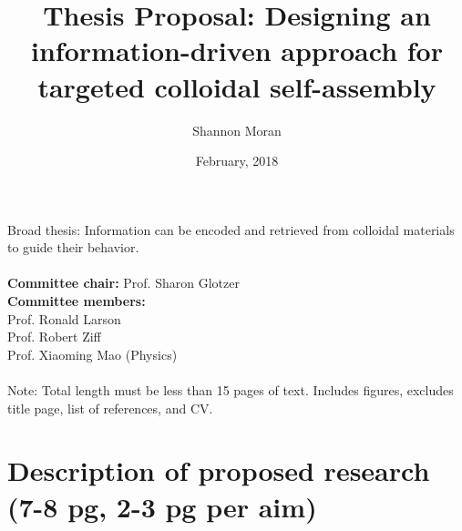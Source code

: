 \documentclass[12pt, oneside]{article}   	%
\title{Thesis Proposal: Designing an information-driven approach for targeted colloidal self-assembly}
\author{Shannon Moran}
\date{February, 2018}
\begin{document}
\maketitle
\thispagestyle{empty}
\noindent
Broad thesis: Information can be encoded and retrieved from colloidal materials to guide their behavior.
\\ \\
\textbf{Committee chair:} Prof. Sharon Glotzer \\ \textbf{Committee members:} \\ Prof. Ronald Larson \\ Prof. Robert Ziff \\ Prof. Xiaoming Mao (Physics)
\\ \\
Note: Total length must be less than 15 pages of text. Includes figures, excludes title page, list of references, and CV.


\newpage
\thispagestyle{empty}
\tableofcontents
\listoffigures


\newpage



\clearpage
\setcounter{page}{1}








\section{Description of proposed research (7-8 pg, 2-3 pg per aim)}
\end{document}
